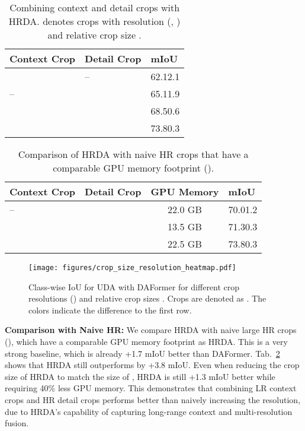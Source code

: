 \documentclass[journal,compsoc]{IEEEtran}
\newcommand{\spm}[1]{\tiny{#1}}
\begin{document}
\begin{table}
\centering
\caption{
Combining context and detail crops with HRDA.  denotes crops with resolution  (, ) and relative crop size .
}
\label{tab:context_crop_size}
\setlength{\tabcolsep}{5pt}
\footnotesize
\begin{tabular}{lll}
\toprule
Context Crop & Detail Crop &           mIoU \\
\midrule
 &       -- & 62.1\spm{2.1} \\
-- &    & 65.1\spm{1.9} \\
 &    & 68.5\spm{0.6} \\
 &    & 73.8\spm{0.3} \\
\bottomrule
\end{tabular}
\end{table}



\begin{table}
\centering
\caption{Comparison of HRDA with naive HR crops that have a comparable GPU memory footprint ().}
\label{tab:baselines}
\setlength{\tabcolsep}{3pt}
\footnotesize
\begin{tabular}{llcl}
\toprule
Context Crop & Detail Crop & GPU Memory &            mIoU \\
\midrule
          -- &      &  22.0 GB &  70.0\spm{1.2} \\
      &     &  13.5 GB &  71.3\spm{0.3} \\
       &       &  22.5 GB &  73.8\spm{0.3} \\
\bottomrule
\end{tabular}
\end{table}


 
\begin{figure}[tb]
\centering
\texttt{[image: figures/crop\_size\_resolution\_heatmap.pdf]}
\caption{
Class-wise IoU for UDA with DAFormer for different crop resolutions  () and relative crop sizes . Crops are denoted as . The colors indicate the difference to the first row.
}
\label{fig:crop_resolution_heatmap}
\end{figure}



\noindent\textbf{Comparison with Naive HR:} We compare HRDA with naive large HR crops (), which have a comparable GPU memory footprint as HRDA. This is a very strong baseline, which is already +1.7 mIoU better than DAFormer. Tab.~\ref{tab:baselines} shows that HRDA still outperforms  by +3.8 mIoU. Even when reducing the crop size of HRDA to match the size of , HRDA is still +1.3 mIoU better while requiring 40\% less GPU memory. This demonstrates that combining LR context crops and HR detail crops performs better than naively increasing the resolution, due to HRDA's capability of capturing long-range context and multi-resolution fusion.
\end{document}
